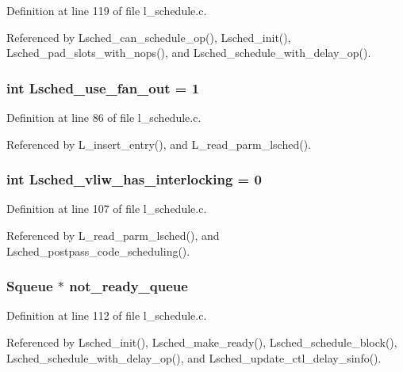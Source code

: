Definition at line 119 of file l\_\-schedule.c.

Referenced by Lsched\_\-can\_\-schedule\_\-op(), Lsched\_\-init(), Lsched\_\-pad\_\-slots\_\-with\_\-nops(), and Lsched\_\-schedule\_\-with\_\-delay\_\-op().
\subsubsection{\setlength{\rightskip}{0pt plus 5cm}int \bf{Lsched\_\-use\_\-fan\_\-out} = 1}\label{l__schedule_8c_dc2b7936a51554fc91cf180edacf0b19}




Definition at line 86 of file l\_\-schedule.c.

Referenced by L\_\-insert\_\-entry(), and L\_\-read\_\-parm\_\-lsched().
\subsubsection{\setlength{\rightskip}{0pt plus 5cm}int \bf{Lsched\_\-vliw\_\-has\_\-interlocking} = 0}\label{l__schedule_8c_50679cc20a4e01b36d91b0593ea51875}




Definition at line 107 of file l\_\-schedule.c.

Referenced by L\_\-read\_\-parm\_\-lsched(), and Lsched\_\-postpass\_\-code\_\-scheduling().
\subsubsection{\setlength{\rightskip}{0pt plus 5cm}\bf{Squeue} $\ast$ \bf{not\_\-ready\_\-queue}}\label{l__schedule_8c_fe3f0aa3f7900d8acb68f9c302f32a7f}




Definition at line 112 of file l\_\-schedule.c.

Referenced by Lsched\_\-init(), Lsched\_\-make\_\-ready(), Lsched\_\-schedule\_\-block(), Lsched\_\-schedule\_\-with\_\-delay\_\-op(), and Lsched\_\-update\_\-ctl\_\-delay\_\-sinfo().
